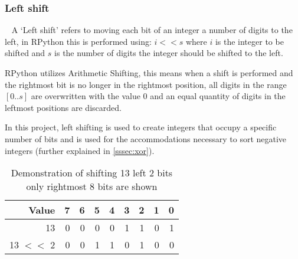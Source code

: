 \documentclass[12pt]{article}
\begin{document}
\subsubsection{Left shift}\
\label{sssec:leftshift}
A `Left shift' refers to moving each bit of an integer a number of digits to the left, in RPython this is performed using: $i << s$ where $i$ is the integer to be shifted and $s$ is the number of digits the integer should be shifted to the left.
\par
RPython utilizes Arithmetic Shifting, this means when a shift is performed and the rightmost bit is no longer in the rightmost position, all digits in the range $[0 .. s]$ are overwritten with the value 0 and an equal quantity of digits in the leftmost positions are discarded.
\par
In this project, left shifting is used to create integers that occupy a specific number of bits and is used for the accommodations necessary to sort negative integers (further explained in \ref{sssec:xor}). 
\par

\begin{table}[htpb]
	\centering
\begin{tabular}{r|rrrrrrrr}
	
	\hline
	 Value   &   7 &   6 &   5 &   4 &   3 &   2 &   1 &   0 \\
	\hline
	 13      &   0 &   0 &   0 &   0 &   1 &   1 &   0 &   1 \\
	 13 \ensuremath{<}\ensuremath{<} 2 &   0 &   0 &   1 &   1 &   0 &   1 &   0 &   0 \\
	\hline
\end{tabular}
\caption{Demonstration of shifting 13 left 2 bits \\ only rightmost 8 bits are shown}
\end{table}
\pagebreak
\end{document}
